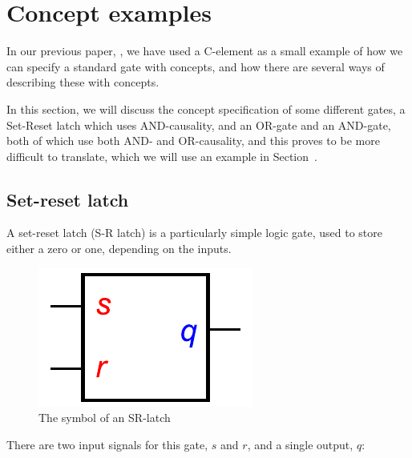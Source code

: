 \documentclass[british, journal]{IEEEtran}
\begin{document}
\section{Concept examples \label{sec:examples}}

In our previous paper, \cite{2015_Beaumont_MEMOCODE}, we have 
used a C-element as a small example of how we can specify a standard gate with concepts,
and how there are several ways of describing these with concepts. 

In this section, we will discuss the concept specification of some different gates,
a Set-Reset latch which uses AND-causality, and an OR-gate and an AND-gate, both of 
which use both AND- and OR-causality, and this proves to be more difficult to translate,
which we will use an example in Section~\label{translation-algorithm}.

\vspace{-3mm}

\subsection{Set-reset latch \label{sub:srlatch}}

A set-reset latch (S-R latch) is a particularly simple logic gate, used to store either a zero or one,
depending on the inputs. 

\vspace{-5mm}

\begin{figure}[h]
\begin{centering}
\includegraphics[scale=0.51]{Images/sr-latch-circuit}
\par\end{centering}
\vspace{-1mm}
\protect\caption{\label{fig:sr-latch-circuit} The symbol of an SR-latch}
\vspace{-3mm}
\end{figure}

\noindent There are two input signals for this gate, $s$ and $r$, and a single output, $q$: 
\end{document}
